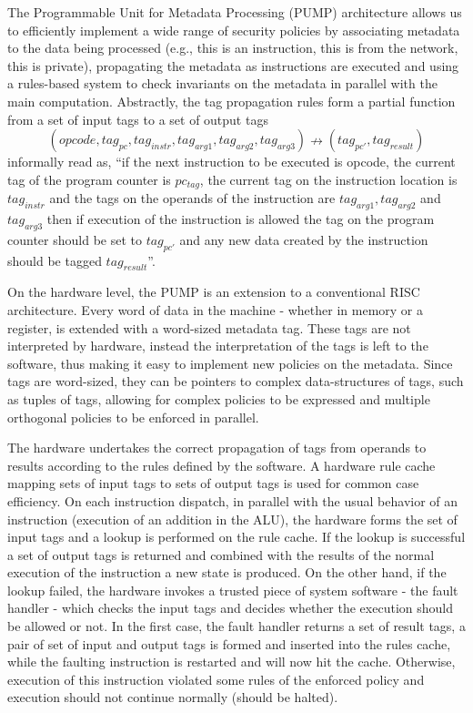 The Programmable Unit for Metadata Processing (PUMP) architecture
\cite{pump_hasp2014}
allows us to efficiently implement a wide range of security policies 
\cite{pump_ccs2014} by associating metadata to the data being processed 
(e.g., this is an instruction, this is from the network, this is private),
propagating the metadata as instructions are executed and using a rules-based 
system to check invariants on the metadata in parallel with the main computation.
Abstractly, the tag propagation rules form a partial function from a set of 
input tags to a set of output tags
$$(opcode, tag_{pc},tag_{instr}, tag_{arg1}, tag_{arg2}, tag_{arg3})
\nrightarrow (tag_{pc'},tag_{result})$$
informally read as, ``if the next instruction to be executed is opcode, the 
current tag of the program counter is $pc_{tag}$, the current tag on the 
instruction location is $tag_{instr}$ and the tags on the operands of the 
instruction are $tag_{arg1}, tag_{arg2}$ and $tag_{arg3}$ then if execution of 
the instruction is allowed the tag on the program counter should be set
to $tag_{pc'}$ and any new data created by the instruction should be tagged 
$tag_{result}$''.

On the hardware level, the PUMP is an extension to a conventional RISC 
architecture. Every word of data in the machine - whether in memory 
or a register, is extended with a word-sized metadata tag.
These tags are not interpreted by hardware, instead the interpretation of the 
tags is left to the software, thus making it easy to implement new policies on 
the metadata. Since tags are word-sized, they can be pointers to complex 
data-structures of tags, such as tuples of tags, allowing for complex policies 
to be expressed and multiple orthogonal policies to be enforced in parallel.

The hardware undertakes the correct propagation of tags from operands to results 
according to the rules defined by the software. 
A hardware rule cache mapping sets of input tags to sets of output tags is used 
for common case efficiency. On each instruction dispatch, in parallel 
with the usual behavior of an instruction 
(\EG execution of an addition in the ALU), the hardware forms the set of input 
tags and a lookup is performed on the rule cache. If the lookup is successful
a set of output tags is returned and combined with the results of the normal 
execution of the  instruction a new state is produced. On the other hand, 
if the lookup failed, the hardware invokes a trusted piece of system software - 
the fault handler - which checks the input tags and decides whether the 
execution should be allowed or not. In the first case, the fault handler returns
a set of result tags, a pair of set of input and output tags is formed and
inserted into the rules cache, while the faulting instruction is restarted 
and will now hit the cache. Otherwise, execution of this instruction violated 
some rules of the enforced policy and execution should not continue normally 
(\EG should be halted).

